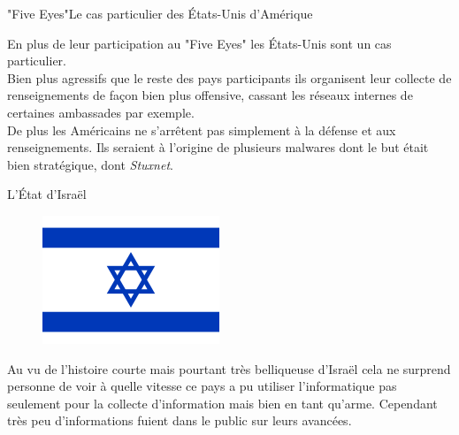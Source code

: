 \documentclass{beamer}
\begin{document}
\begin{frame}{"Five Eyes"}{Le cas particulier des États-Unis d'Amérique}

En plus de leur participation au "Five Eyes" les États-Unis sont un cas particulier.\\
Bien plus agressifs que le reste des pays participants ils organisent leur collecte de renseignements de façon bien plus offensive, cassant les réseaux internes de certaines ambassades par exemple.\\
\vspace{10pt}
De plus les Américains ne s'arrêtent pas simplement à la défense et aux renseignements. Ils seraient à l'origine de plusieurs malwares dont le but était bien stratégique, dont \emph{Stuxnet}.

\end{frame}

\begin{frame}{L'État d'Israël}

    \begin{figure}[h]
        \includegraphics[scale=0.2]{Flag_of_Israel}
    \end{figure}
    
    Au vu de l'histoire courte mais pourtant très belliqueuse d'Israël cela ne surprend personne de voir à quelle vitesse ce pays a pu utiliser l'informatique pas seulement pour la collecte d'information mais bien en tant qu'arme. Cependant très peu d'informations fuient dans le public sur leurs avancées.
    

\end{frame}
\end{document}
